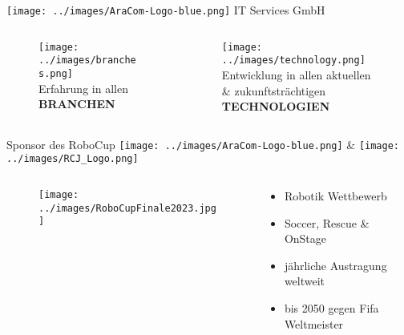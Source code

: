 \documentclass[aspectratio=169]{beamer}
\begin{document}
\begin{frame}{\texttt{[image: ../images/AraCom-Logo-blue.png]} IT Services GmbH}
{\begin{columns}
\begin{column}{0.20\textwidth}
        \begin{figure}
          \centering
          \texttt{[image: ../images/branches.png]}\\
          Erfahrung in allen\\\textbf{BRANCHEN}\newline\newline
        \end{figure}
      \end{column}
      \begin{column}{0.20\textwidth}
        \begin{figure}
          \centering
          \texttt{[image: ../images/technology.png]}\\
          Entwicklung in allen aktuellen \& zukunftsträchtigen\\
          \textbf{TECHNOLOGIEN}
        \end{figure}
      \end{column}
    \end{columns}
  }
\end{frame}

\begin{frame}{Sponsor des RoboCup}
  \texttt{[image: ../images/AraCom-Logo-blue.png]} {\LARGE \&} \hspace{.2cm}
  \texttt{[image: ../images/RCJ\_Logo.png]}
  \begin{columns}
    \begin{column}{0.45\textwidth}
      \begin{figure}[h]
        \centering
        \texttt{[image: ../images/RoboCupFinale2023.jpg]}
      \end{figure}
    \end{column}
    \begin{column}{0.45\textwidth}
      \begin{itemize}
        \item Robotik Wettbewerb
        \item Soccer, Rescue \& OnStage
        \item jährliche Austragung weltweit
        \item bis 2050 gegen Fifa Weltmeister
      \end{itemize}
    \end{column}
  \end{columns}
\end{frame}
\end{document}
